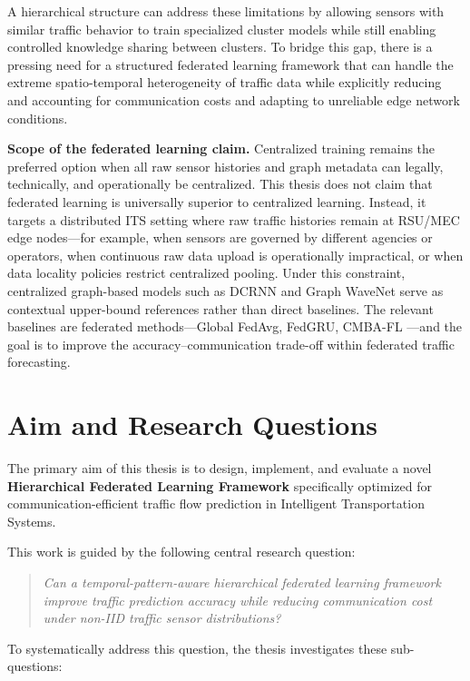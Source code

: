 A hierarchical structure can address these limitations by allowing sensors with similar traffic behavior to train specialized cluster models while still enabling controlled knowledge sharing between clusters. To bridge this gap, there is a pressing need for a structured federated learning framework that can handle the extreme spatio-temporal heterogeneity of traffic data while explicitly reducing and accounting for communication costs and adapting to unreliable edge network conditions.

\textbf{Scope of the federated learning claim.} Centralized training remains the preferred option when all raw sensor histories and graph metadata can legally, technically, and operationally be centralized. This thesis does not claim that federated learning is universally superior to centralized learning. Instead, it targets a distributed ITS setting where raw traffic histories remain at RSU/MEC edge nodes---for example, when sensors are governed by different agencies or operators, when continuous raw data upload is operationally impractical, or when data locality policies restrict centralized pooling. Under this constraint, centralized graph-based models such as DCRNN \cite{li2018} and Graph WaveNet \cite{wu2019graphwavenet} serve as contextual upper-bound references rather than direct baselines. The relevant baselines are federated methods---Global FedAvg, FedGRU, CMBA-FL \cite{zhu2025cmba}---and the goal is to improve the accuracy--communication trade-off within federated traffic forecasting.

\section{Aim and Research Questions}
The primary aim of this thesis is to design, implement, and evaluate a novel \textbf{Hierarchical Federated Learning Framework} specifically optimized for communication-efficient traffic flow prediction in Intelligent Transportation Systems.

This work is guided by the following central research question:

\begin{quote}
\textit{Can a temporal-pattern-aware hierarchical federated learning framework improve traffic prediction accuracy while reducing communication cost under non-IID traffic sensor distributions?}
\end{quote}

\noindent To systematically address this question, the thesis investigates these sub-questions:

